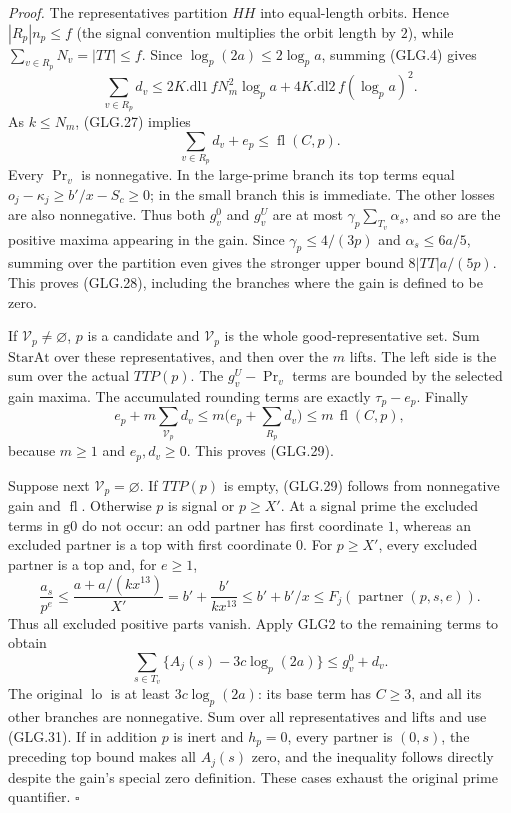 \documentclass[11pt,a4paper]{article}
\numberwithin{equation}{section}
\theoremstyle{remark}\newtheorem{remark}[theorem]{Remark}
\begin{document}
\emph{Proof.}
The representatives partition \(HH\) into equal-length orbits.
Hence \(|R_p|n_p\le f\) (the signal convention multiplies
the orbit length by \(2\)), while \(\sum_{v\in R_p}N_v=|TT|\le f\).
Since \(\log_p(2a)\le2\log_pa\), summing (GLG.4) gives
\[
 \sum_{v\in R_p}d_v
 \le2K.\mathrm{dl1}\,fN_m^2\log_pa
                      +4K.\mathrm{dl2}\,f(\log_pa)^2 .
 \]
As \(k\le N_m\), (GLG.27) implies
\[
                     \sum_{v\in R_p}d_v+e_p
                                      \le\operatorname{fl}(C,p). \tag{GLG.31}
\]
Every \(\Pr_v\) is nonnegative. In the large-prime branch
its top terms equal \(o_j-\kappa_j\ge b'/x-S_c\ge0\);
in the small branch this is immediate. The other losses
are also nonnegative. Thus both \(g_v^0\) and \(g_v^U\)
are at most \(\gamma_p\sum_{T_v}\alpha_s\), and so are
the positive maxima appearing in the gain. Since
\(\gamma_p\le4/(3p)\) and \(\alpha_s\le6a/5\), summing
over the partition even gives the stronger upper bound
\(8|TT|a/(5p)\). This proves (GLG.28), including the
branches where the gain is defined to be zero.

If \(\mathcal V_p\ne\varnothing\), \(p\) is a candidate
and \(\mathcal V_p\) is the whole good-representative set.
Sum \(\mathrm{StarAt}\) over these representatives, and
then over the \(m\) lifts. The left side is the sum over
the actual \(TTP(p)\). The \(g_v^U-\Pr_v\) terms are
bounded by the selected gain maxima. The accumulated
rounding terms are exactly \(\tau_p-e_p\). Finally
\[
 e_p+m\sum_{\mathcal V_p}d_v
   \le m\bigl(e_p+\sum_{R_p}d_v\bigr)
   \le m\,\operatorname{fl}(C,p),
 \]
because \(m\ge1\) and \(e_p,d_v\ge0\). This proves (GLG.29).

Suppose next \(\mathcal V_p=\varnothing\). If \(TTP(p)\)
is empty, (GLG.29) follows from nonnegative gain and
\(\operatorname{fl}\). Otherwise \(p\) is signal or
\(p\ge X'\). At a signal prime the excluded terms in
\(\mathrm{g0}\) do not occur: an odd partner has first
coordinate \(1\), whereas an excluded partner is a top
with first coordinate \(0\). For \(p\ge X'\), every
excluded partner is a top and, for \(e\ge1\),
\[
 \frac{a_s}{p^e}
 \le\frac{a+a/(kx^{13})}{X'}
       =b'+\frac{b'}{kx^{13}}
       \le b'+b'/x\le F_j(\operatorname{partner}(p,s,e)).
 \]
Thus all excluded positive parts vanish. Apply GLG2 to
the remaining terms to obtain
\[
 \sum_{s\in T_v}\{A_j(s)-3c\log_p(2a)\}
                                      \le g_v^0+d_v .
 \]
The original \(\operatorname{lo}\) is at least
\(3c\log_p(2a)\): its base term has \(C\ge3\), and all
its other branches are nonnegative. Sum over all
representatives and lifts and use (GLG.31).
If in addition \(p\) is inert and \(h_p=0\), every partner
is \((0,s)\), the preceding top bound makes all \(A_j(s)\)
zero, and the inequality follows directly despite the
gain's special zero definition. These cases exhaust the
original prime quantifier.
\hfill\(\square\)
\end{document}
